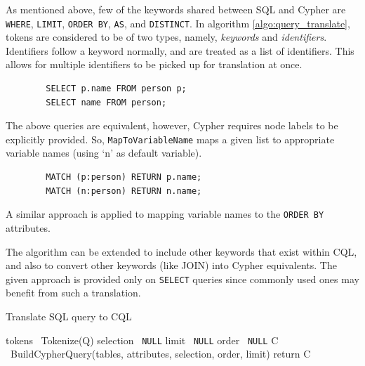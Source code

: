 \documentclass[12pt]{article}
\begin{document}
    As mentioned above, few of the keywords shared between SQL and Cypher are \verb|WHERE|, \verb|LIMIT|, \verb|ORDER BY|, \verb|AS|, and \verb|DISTINCT|. In algorithm \ref{algo:query_translate}, tokens are considered to be of two types, namely, \textit{keywords} and \textit{identifiers}. Identifiers follow a keyword normally, and are treated as a list of identifiers. This allows for multiple identifiers to be picked up for translation at once.

    \begin{lstlisting}
        SELECT p.name FROM person p;
        SELECT name FROM person;
    \end{lstlisting}
    The above queries are equivalent, however, Cypher requires node labels to be explicitly provided. So, \verb|MapToVariableName| maps a given list to appropriate variable names (using `n' as default variable).
    \begin{lstlisting}
        MATCH (p:person) RETURN p.name;
        MATCH (n:person) RETURN n.name;
    \end{lstlisting}
    A similar approach is applied to mapping variable names to the \verb|ORDER BY| attributes.

    The algorithm can be extended to include other keywords that exist within CQL, and also to convert other keywords (like JOIN) into Cypher equivalents. The given approach is provided only on \verb|SELECT| queries since commonly used ones may benefit from such a translation.


    \begin{algorithm}[htb!]
        \SetAlgoLined
        \caption{Translate SQL query to CQL}
        tokens \gets\ Tokenize(Q)
        selection \gets\ \verb|NULL|\;
        limit \gets\ \verb|NULL|\;
        order \gets\ \verb|NULL|\;
        C \gets\ BuildCypherQuery(tables, attributes, selection, order, limit)\;
        return C\;
        \label{algo:query_translate}
    \end{algorithm}
\end{document}
